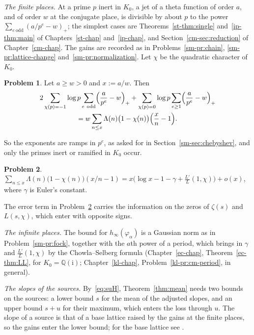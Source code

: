 \documentclass[reqno]{amsart}
\newcounter{chap}
\theoremstyle{definition}
\newtheorem{problem}{Problem}[section]
\theoremstyle{plain}
\newcommand{\Q}{\mathbb{Q}}
\newcommand{\ii}{\mathrm{i}}
\begin{document}
\emph{The finite places.}  At a prime \(p\) inert in \(K_0\), a jet of a theta function of order \(a\), and of order \(w\) at the conjugate place, is divisible by about \(p\) to the power \(\sum_{e\ \mathrm{odd}} (a/p^e - w)_+\); the simplest cases are Theorems~\ref{st-thm:single} and~\ref{ip-thm:main} of Chapters~\ref{st-chap} and~\ref{ip-chap}, and Section~\ref{cm-sec:reduction} of Chapter~\ref{cm-chap}.  The gains are recorded as in Problems~\ref{sm-pr:chain}, \ref{sm-pr:lattice-change} and~\ref{sm-pr:normalization}.  Let \(\chi\) be the quadratic character of \(K_0\).

\begin{problem}\label{pr:ramp}
Let \(a \ge w > 0\) and \(x := a/w\).  Then
\begin{multline*}
  2 \sum_{\chi(p) = -1} \log p \sum_{e\ \mathrm{odd}} \Bigl( \frac{a}{p^e} - w \Bigr)_+ + \sum_{\chi(p) = 0} \log p \sum_{e \ge 1} \Bigl( \frac{a}{p^e} - w \Bigr)_+ \\
  = w \sum_{n \le x} \Lambda(n) \bigl(1 - \chi(n)\bigr) \Bigl( \frac{x}{n} - 1 \Bigr) .
\end{multline*}
\end{problem}

So the exponents are ramps in \(p^e\), as asked for in Section~\ref{sm-sec:chebyshev}, and only the primes inert or ramified in \(K_0\) occur.

\begin{problem}\label{pr:main-term}
\(\sum_{n \le x} \Lambda(n) \bigl(1 - \chi(n)\bigr) (x/n - 1) = x \bigl( \log x - 1 - \gamma + \tfrac{L'}{L}(1, \chi) \bigr) + o(x)\), where \(\gamma\) is Euler's constant.
\end{problem}

The error term in Problem~\ref{pr:main-term} carries the information on the zeros of \(\zeta(s)\) and \(L(s, \chi)\), which enter with opposite signs.

\emph{The infinite places.}  The bound for \(h_\infty(\varphi_\alpha)\) is a Gaussian norm as in Problem~\ref{sm-pr:fock}, together with the \(a\)th power of a period, which brings in \(\gamma\) and \(\tfrac{L'}{L}(1, \chi)\) by the Chowla--Selberg formula (Chapter~\ref{ec-chap}, Theorem~\ref{ec-thm:LL}, for \(K_0 = \Q(\ii)\); Chapter~\ref{kl-chap}, Problem~\ref{kl-pr:cm-period}, in general).

\emph{The slopes of the sources.}  By~\eqref{eq:suH}, Theorem~\ref{thm:mean} needs two bounds on the sources: a lower bound \(s\) for the mean of the adjusted slopes, and an upper bound \(s + u\) for their maximum, which enters the loss through \(u\).  The slope of a source is that of a base lattice raised by the gains at the finite places, so the gains enter the lower bound; for the base lattice see \cite[(3.2), (3.7) and \S15.7]{Adr}.
\end{document}
